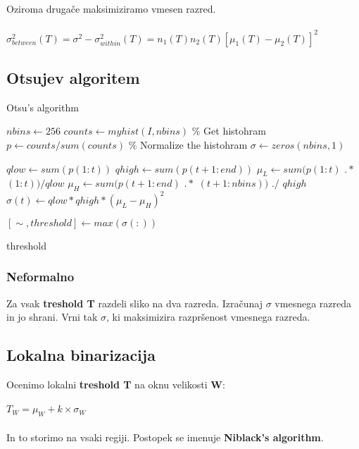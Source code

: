 \documentclass[11pt]{article}
\begin{document}
Oziroma druga\v{c}e maksimiziramo vmesen razred. \\
\\
$\sigma^2_{between}(T) = \sigma^2 - \sigma^2_{within}(T) = n_1(T)n_2(T)[\mu_1(T) - \mu_2(T)]^2$

\newpage

\subsection{Otsujev algoritem}

\begin{algorithm}
\caption{Otsu's algorithm}\label{euclid}
\begin{algorithmic}[1]


\State $\textit{nbins} \gets 256$
\State $counts \gets myhist(I, nbins)$ \% Get histohram
\State $\textit{p} \gets counts / sum(counts)$ \% Normalize the histohram
\State $\sigma \gets zeros(nbins, 1)$

\State $qlow \gets sum(p(1:t))$
\State $qhigh \gets sum(p(t + 1 : end))$
\State $\mu_L \gets sum(p(1:t)$ $.*$ $(1:t)) / qlow$ 
\State $\mu_H \gets sum(p(t + 1 : end)$ $.*$ $(t + 1 : nbins))$ $./$ $qhigh$
\State $\sigma(t) \gets qlow * qhigh * (\mu_L - \mu_H) ^ 2$
\EndFor

\State $[\sim, threshold] \gets max(\sigma(:))$

\Return threshold

\EndProcedure
\end{algorithmic}
\end{algorithm}

\subsubsection*{Neformalno}
Za vsak \textbf{treshold T} razdeli sliko na dva razreda. Izra\v{c}unaj $\sigma$ vmesnega razreda in jo shrani. Vrni tak $\sigma$, ki maksimizira razpr\v{s}enost vmesnega razreda.

\subsection{Lokalna binarizacija}
Ocenimo lokalni \textbf{treshold T} na oknu velikosti \textbf{W}: \\
\\
$T_W = \mu_W + k \times \sigma_W$ \\
\\
In to storimo na vsaki regiji. Postopek se imenuje \textbf{Niblack's algorithm}.
\end{document}
